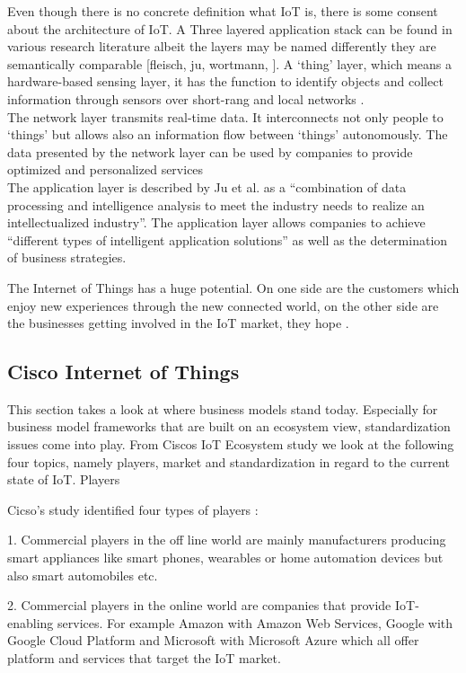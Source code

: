 	Even though there is no concrete definition what IoT is, there is some consent about the architecture of IoT. A Three layered application stack can be found in various research literature albeit the layers may be named differently they are semantically comparable [fleisch, ju, wortmann, ]. A `thing' layer, which means a hardware-based sensing layer, it has the function to identify objects and collect information through sensors over short-rang and local networks \cite{ju}.\\
	The network layer transmits real-time data. It interconnects not only people to `things' but allows also an information flow between `things' autonomously. The data presented by the network layer can be used by companies to provide optimized and personalized services \cite{ju}\\
	The application layer is described by Ju et al. as a ``combination of data processing and intelligence analysis to meet the industry needs to realize an intellectualized industry''. The application layer allows companies to achieve ``different types of intelligent application solutions'' as well as the determination of business strategies\cite{ju}.

	The Internet of Things has a huge potential. On one side are the customers which enjoy new experiences through the new connected world, on the other side are the businesses getting involved in the IoT market, they hope \cite{ju}.

	\subsection{Cisco Internet of Things}
		This section takes a look at where business models stand today. Especially for business model frameworks that are built on an ecosystem view, standardization issues come into play. From Ciscos IoT Ecosystem study we look at the following four topics, namely players, market and standardization in regard to the current state of IoT.
		Players

		Cicso's study identified four types of players \cite{cisco}:

		1. Commercial players in the off line world are mainly manufacturers producing smart appliances like smart phones, wearables or home automation devices but also smart automobiles etc.

		2. Commercial players in the online world are companies that provide IoT-enabling services. For example Amazon with Amazon Web Services, Google with Google Cloud Platform and Microsoft with Microsoft Azure which all offer platform and services that target the IoT market.

